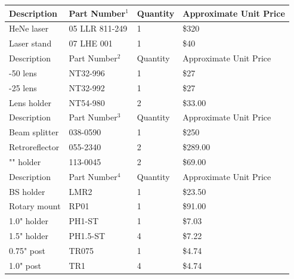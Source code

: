\begin{table}
\begin{center}
\begin{tabular}{l l l l}
\hline
Description     & Part Number$^1$     & Quantity   & Approximate Unit Price\\
\hline
HeNe laser      & 05 LLR 811-249  & 1         & \$320 \\
Laser stand     & 07 LHE 001      & 1         & \$40 \\
\hline
Description     & Part Number$^2$     & Quantity &  Approximate Unit Price\\
\hline
-50 lens        & NT32-996        & 1        &  \$27 \\
-25 lens        & NT32-992        & 1        &  \$27 \\
Lens holder     & NT54-980        & 2        &  \$33.00\\
\hline
Description  &   Part Number$^3$  &   Quantity  & Approximate Unit Price\\
\hline
Beam splitter  &  038-0590     &   1    &      \$250\\
Retroreflector & 055-2340      &  2     &     \$289.00\\
"" holder      &  113-0045     &   2    &      \$69.00\\
\hline 
Description   &  Part Number$^4$  &   Quantity   & Approximate Unit Price\\
\hline
BS holder    &   LMR2         &   1       &   \$23.50\\
Rotary mount &   RP01         &   1       &   \$91.00 \\
1.0" holder  &   PH1-ST       &   1       &   \$7.03\\
1.5" holder  &   PH1.5-ST     &   4       &   \$7.22\\
0.75" post   &   TR075        &   1       &   \$4.74 \\
1.0" post    &   TR1          &   4       &   \$4.74 \\

\end{tabular}
\end{center}
\end{table}
